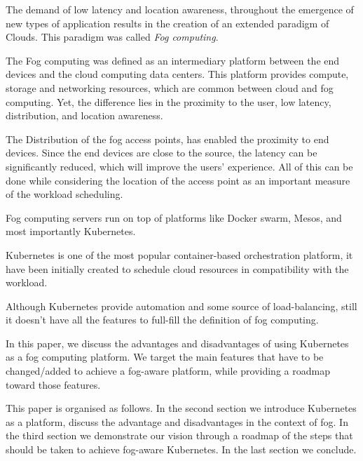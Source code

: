 \documentclass[letterpaper,twocolumn,10pt]{article}
\begin{document}
The demand of low latency and location awareness, throughout the emergence of new types of application results in the creation of an extended paradigm of     Clouds. This paradigm was called {\em Fog computing}\cite{bonomi2011connected,Bonomi:2012:FCR:2342509.2342513}.

The Fog computing was defined as an intermediary platform between the end devices and the cloud computing data centers. This platform provides compute, storage and networking resources, which are common between cloud and fog computing. Yet, the difference lies in the proximity to the user, low latency, distribution, and location awareness. 

The Distribution of the fog access points, has enabled the proximity to end devices. Since the end devices are close to the source, the latency can be significantly reduced, which will improve the users' experience. All of this can be done while considering the location of the access point as an important measure of the workload scheduling.

Fog computing servers run on top of platforms like Docker swarm, Mesos, and most importantly Kubernetes.

Kubernetes is one of the most popular container-based orchestration  platform, it have been initially created to schedule cloud resources in compatibility with the workload.

Although Kubernetes provide automation and some source of load-balancing, still it doesn't have all the features to full-fill the definition  of fog computing.    

In this paper, we discuss the advantages and disadvantages of using Kubernetes as a fog computing platform. We target the main features that have to be changed/added to achieve a fog-aware platform, while providing a roadmap toward those features.


This paper is organised as follows. In the second section we introduce Kubernetes as a platform, discuss the advantage and disadvantages in the context of fog. In the third section we demonstrate our vision through a roadmap of the steps that should be taken to achieve fog-aware Kubernetes. In the last section we conclude. 
\end{document}
